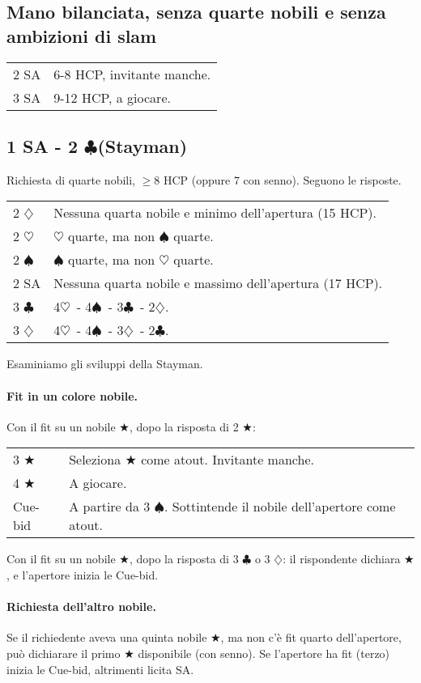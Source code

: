 \documentclass[a4paper,10pt]{article}
\renewcommand{\c}{$\clubsuit$\xspace}
\renewcommand{\d}{$\diamondsuit$\xspace}
\newcommand{\h}{$\heartsuit$\xspace}
\newcommand{\s}{$\spadesuit$\xspace}
\renewcommand{\j}{$\bigstar$\xspace}
\newcommand{\sa}{SA\xspace}
\newcommand{\smallspace}{\vskip0.3cm}
\newenvironment{twocol}
  {\smallspace\noindent\begin{tabular}{l p{0.78\textwidth}}}
  {\end{tabular}\smallspace}
\begin{document}
\subsection{Mano bilanciata, senza quarte nobili e senza ambizioni di slam}

\begin{twocol}
 2 \sa & 6-8 HCP, invitante manche.\\
 3 \sa & 9-12 HCP, a giocare.
\end{twocol}


\subsection{1 SA - 2 \c (Stayman)}

Richiesta di quarte nobili, $\geq 8$ HCP (oppure 7 con senno). Seguono le risposte.

\begin{twocol}
 2 \d & Nessuna quarta nobile e minimo dell'apertura (15 HCP).\\
 2 \h & \h quarte, ma non \s quarte.\\
 2 \s & \s quarte, ma non \h quarte.\\
 2 SA & Nessuna quarta nobile e massimo dell'apertura (17 HCP).\\
 3 \c & 4\h\ - 4\s\ - 3\c\ - 2\d.\\
 3 \d & 4\h\ - 4\s\ - 3\d\ - 2\c.\\
\end{twocol}

\noindent Esaminiamo gli sviluppi della Stayman.

\paragraph{Fit in un colore nobile.}

Con il fit su un nobile \j, dopo la risposta di 2 \j:
\begin{twocol}
 3 \j & Seleziona \j come atout. Invitante manche.\\
 4 \j & A giocare.\\
 Cue-bid & A partire da 3 \s. Sottintende il nobile dell'apertore come atout.\\
\end{twocol}

\noindent Con il fit su un nobile \j, dopo la risposta di 3 \c o 3 \d: il rispondente dichiara \j, e l'apertore inizia le Cue-bid.


\paragraph{Richiesta dell'altro nobile.}
Se il richiedente aveva una quinta nobile \j, ma non c'\`e fit quarto dell'apertore, può dichiarare il primo \j disponibile (con senno). Se l'apertore ha fit (terzo) inizia le Cue-bid, altrimenti licita \sa.
\end{document}
